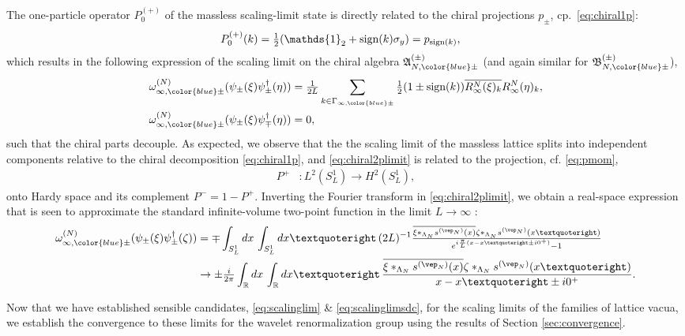 \documentclass[a4paper, 11pt]{article}
\newcommand{\fA}{\mathfrak{A}}\newcommand{\cA}{\mathcal{A}}\newcommand{\dA}{\mathds{A}}\newcommand{\sA}{\mathscr{A}}
\newcommand{\fB}{\mathfrak{B}}\newcommand{\cB}{\mathcal{B}}\newcommand{\dB}{\mathds{B}}\newcommand{\sB}{\mathscr{B}}
\newcommand{\RR}{\mathbb{R}}\newcommand{\R}{\mathbb{R}}
\DeclareMathOperator{\1}{\mathds{1}}
\DeclareMathOperator{\sign}{\textup{sign}}
\begin{document}
The one-particle operator $P^{(+)}_{0}$ of the massless scaling-limit state is directly related to the chiral projections $p_{\pm}$, cp.~\eqref{eq:chiral1p}:
\begin{align}
\label{eq:masslesslimproj}
P^{(+)}_{0}(k) & = \tfrac{1}{2}(\mathds{1}_{2}+\sign(k)\sigma_{y}) = p_{\sign(k)},
\end{align}
which results in the following expression of the scaling limit on the chiral algebra $\fA^{(\pm)}_{N,{\color{blue}\pm}}$ (and again similar for $\fB^{(\pm)}_{N,{\color{blue}\pm}}$),
\begin{align}
\label{eq:chiral2plimit}
\omega^{(N)}_{\infty,{\color{blue}\pm}}(\psi_{\pm}(\xi)\psi_{\pm}^{\dagger}(\eta)) & = \tfrac{1}{2L}\sum_{k\in\Gamma_{\infty,{\color{blue}\pm}}}\tfrac{1}{2}(1\pm\sign(k))\overline{R^{N}_{\infty}(\xi)_{k}}R^{N}_{\infty}(\eta)_{k}, \\ \nonumber
\omega^{(N)}_{\infty,{\color{blue}\pm}}(\psi_{\pm}(\xi)\psi_{\mp}^{\dagger}(\eta)) & = 0,
\end{align}
such that the chiral parts decouple. As expected, we observe that the the scaling limit of the massless lattice splits into independent components relative to the chiral decomposition \eqref{eq:chiral1p}, and \eqref{eq:chiral2plimit} is related to the projection, cf. \eqref{eq:pmom},
\begin{align}
\label{eq:hardyproj}
P^{+} & : L^{2}(S^{1}_{L}) \longrightarrow H^{2}(S^{1}_{L}),
\end{align}
onto Hardy space and its complement $P^{-} = 1-P^{+}$. Inverting the Fourier transform in \eqref{eq:chiral2plimit}, we obtain a real-space expression that is seen to approximate the standard infinite-volume two-point function in the limit $L\rightarrow\infty$ \cite{AbdallaNonPerturbativeMethods}:
\begin{align}
\label{eq:chiral2preal}
\omega^{(N)}_{\infty,{\color{blue}\pm}}(\psi_{\pm}(\xi)\psi_{\pm}^{\dagger}(\zeta)) & = \mp\int_{S^{1}_{L}}dx\!\ \int_{S^{1}_{L}}dx’\!\ (2L)^{-1}\tfrac{\overline{\xi\ast_{\Lambda_{N}}s^{(\vep_{N})}(x)}\zeta\ast_{\Lambda_{N}}s^{(\vep_{N})}(x’)}{e^{i\frac{\pi}{L}(x-x’\pm i0^{+})}-1} \\ \nonumber
& \rightarrow \pm\tfrac{i}{2\pi}\int_{\RR}dx\!\ \int_{\RR}dx’\!\ \frac{\overline{\xi\ast_{\Lambda_{N}}s^{(\vep_{N})}(x)}\zeta\ast_{\Lambda_{N}}s^{(\vep_{N})}(x’)}{x-x’\pm i0^{+}}.
\end{align}

Now that we have established sensible candidates, \eqref{eq:scalinglim} \& \eqref{eq:scalinglimsdc}, for the scaling limits of the families of lattice vacua, we establish the convergence to these limits for the wavelet renormalization group using the results of Section \ref{sec:convergence}.
\end{document}

